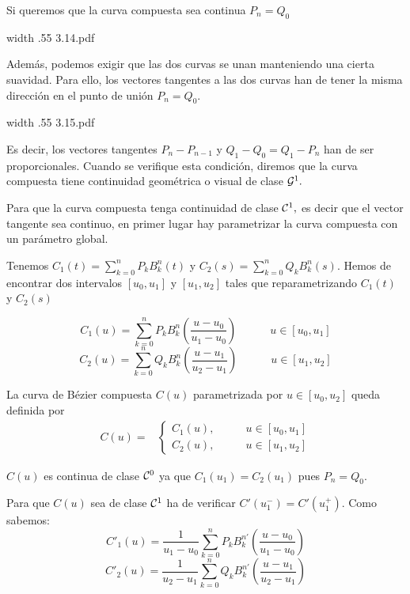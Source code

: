 \documentclass[twoside]{report}
\newcommand{\colocapdf}[2]{\quad\pdfimage width #2 {#1.pdf}}
\begin{document}
Si queremos que la curva compuesta sea continua $P_n=Q_0$

\begin{center}
\colocapdf{3.14}{.55\textwidth}
\end{center}

Adem\'{a}s, podemos exigir que las dos curvas se unan manteniendo una cierta suavidad. Para ello, los vectores tangentes a las dos curvas han de tener la misma direcci\'{o}n en el punto de uni\'{o}n $P_n=Q_0.$

\begin{center}
\colocapdf{3.15}{.55\textwidth}
\end{center}

Es decir, los vectores tangentes $P_n-P_{n-1}$ y $Q_1-Q_0=Q_1-P_n$ han de ser proporcionales. Cuando se verifique esta condici\'{o}n, diremos que la curva compuesta tiene continuidad geom\'{e}trica o visual de clase ${\cal G}^1.$

Para que la curva compuesta tenga continuidad de clase ${\cal C}^1,$ es decir que el vector tangente sea continuo, en primer lugar hay parametrizar la curva compuesta con un par\'{a}metro global.

\vspace{0.3cm}

Tenemos $C_1(t)=\sum_{k=0}^n P_k B_k^n(t)$ y $C_2(s)=\sum_{k=0}^n Q_k B_k^n(s)$. Hemos de encontrar dos intervalos $[u_0,u_1]$ y $[u_1,u_2]$ tales que reparametrizando $C_1(t)$ y $C_2(s)$

$$C_1(u)=\sum_{k=0}^n P_k B_k^n\left(\frac{u-u_0}{u_1-u_0}\right) \quad \quad \quad u\in [u_0,u_1]$$
$$C_2(u)=\sum_{k=0}^n Q_k B_k^n\left(\frac{u-u_1}{u_2-u_1}\right)\quad \quad \quad u\in [u_1,u_2]$$

La curva de B\'{e}zier compuesta $C(u)$ parametrizada por $u\in[u_0,u_2]$ queda definida por
$$\begin{array}{cc} C(u)=& \left\{\begin{array}{cc} C_1(u), & \quad \quad u\in [u_0,u_1]\\ C_2(u), & \quad \quad u\in [u_1,u_2]\end{array}\right. \end{array}$$

$C(u)$ es continua de clase ${\cal C}^0$ ya que $C_1(u_1)=C_2(u_1)$ pues $P_n=Q_0.$

Para que $C(u)$ sea de clase ${\cal C}^1$ ha de verificar $C'(u_1^{-})=C'(u_1^{+}).$ Como sabemos:
$$C'_1(u)=\frac{1}{u_1-u_0}\sum_{k=0}^n P_k B_k^{n \prime} \left(\frac{u-u_0}{u_1-u_0}\right)$$
$$C'_2(u)=\frac{1}{u_2-u_1}\sum_{k=0}^n Q_k B_k^{n \prime} \left(\frac{u-u_1}{u_2-u_1}\right)$$
\end{document}
